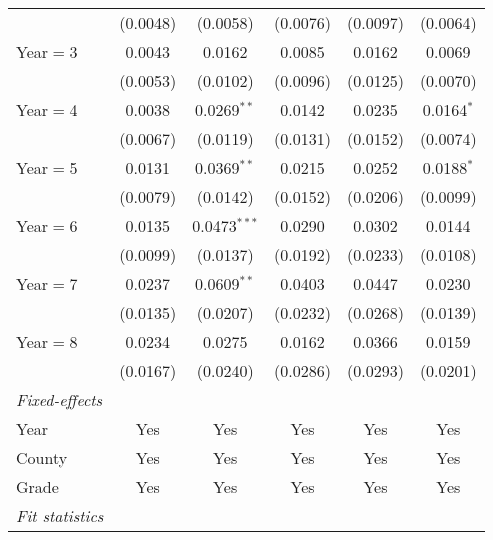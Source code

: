 \begin{table}[htbp]
\begin{tabular}{lccccc}
                           & (0.0048)      & (0.0058)       & (0.0076)     & (0.0097)               & (0.0064)\\
      Year$=$3             & 0.0043        & 0.0162         & 0.0085       & 0.0162                 & 0.0069\\
                           & (0.0053)      & (0.0102)       & (0.0096)     & (0.0125)               & (0.0070)\\
      Year$=$4             & 0.0038        & 0.0269$^{**}$  & 0.0142       & 0.0235                 & 0.0164$^{*}$\\
                           & (0.0067)      & (0.0119)       & (0.0131)     & (0.0152)               & (0.0074)\\
      Year$=$5             & 0.0131        & 0.0369$^{**}$  & 0.0215       & 0.0252                 & 0.0188$^{*}$\\
                           & (0.0079)      & (0.0142)       & (0.0152)     & (0.0206)               & (0.0099)\\
      Year$=$6             & 0.0135        & 0.0473$^{***}$ & 0.0290       & 0.0302                 & 0.0144\\
                           & (0.0099)      & (0.0137)       & (0.0192)     & (0.0233)               & (0.0108)\\
      Year$=$7             & 0.0237        & 0.0609$^{**}$  & 0.0403       & 0.0447                 & 0.0230\\
                           & (0.0135)      & (0.0207)       & (0.0232)     & (0.0268)               & (0.0139)\\
      Year$=$8             & 0.0234        & 0.0275         & 0.0162       & 0.0366                 & 0.0159\\
                           & (0.0167)      & (0.0240)       & (0.0286)     & (0.0293)               & (0.0201)\\
      \midrule \emph{Fixed-effects} &   &   &   &   &  \\
      Year                 & Yes           & Yes            & Yes          & Yes                    & Yes\\
      County               & Yes           & Yes            & Yes          & Yes                    & Yes\\
      Grade                & Yes           & Yes            & Yes          & Yes                    & Yes\\
      \midrule \emph{Fit statistics} &   &   &   &   &  \\

\end{tabular}
\end{table}
